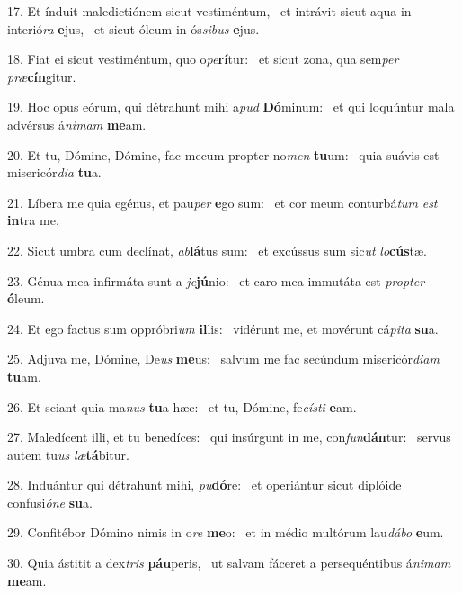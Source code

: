 17. Et índuit maledictiónem sicut vestiméntum, \dag\  et intrávit sicut aqua in interió\textit{ra} \textbf{e}jus, \ast\  et sicut óleum in ós\textit{si}\textit{bus} \textbf{e}jus.\

18. Fiat ei sicut vestiméntum, quo o\textit{pe}\textbf{rí}tur: \ast\  et sicut zona, qua sem\textit{per} \textit{præ}\textbf{cín}gitur.\

19. Hoc opus eórum, qui détrahunt mihi a\textit{pud} \textbf{Dó}minum: \ast\  et qui loquúntur mala advérsus á\textit{ni}\textit{mam} \textbf{me}am.\

20. Et tu, Dómine, Dómine, fac mecum propter no\textit{men} \textbf{tu}um: \ast\  quia suávis est misericór\textit{di}\textit{a} \textbf{tu}a.\

21. Líbera me quia egénus, et pau\textit{per} \textbf{e}go sum: \ast\  et cor meum conturbá\textit{tum} \textit{est} \textbf{in}tra me.\

22. Sicut umbra cum declínat, \textit{ab}\textbf{lá}tus sum: \ast\  et excússus sum sic\textit{ut} \textit{lo}\textbf{cús}tæ.\

23. Génua mea infirmáta sunt a \textit{je}\textbf{jú}nio: \ast\  et caro mea immutáta est \textit{prop}\textit{ter} \textbf{ó}leum.\

24. Et ego factus sum oppróbri\textit{um} \textbf{il}lis: \ast\  vidérunt me, et movérunt cá\textit{pi}\textit{ta} \textbf{su}a.\

25. Adjuva me, Dómine, De\textit{us} \textbf{me}us: \ast\  salvum me fac secúndum misericór\textit{di}\textit{am} \textbf{tu}am.\

26. Et sciant quia ma\textit{nus} \textbf{tu}a hæc: \ast\  et tu, Dómine, fe\textit{cís}\textit{ti} \textbf{e}am.\

27. Maledícent illi, et tu benedíces: \dag\  qui insúrgunt in me, con\textit{fun}\textbf{dán}tur: \ast\  servus autem tu\textit{us} \textit{læ}\textbf{tá}bitur.\

28. Induántur qui détrahunt mihi, \textit{pu}\textbf{dó}re: \ast\  et operiántur sicut diplóide confusi\textit{ó}\textit{ne} \textbf{su}a.\

29. Confitébor Dómino nimis in o\textit{re} \textbf{me}o: \ast\  et in médio multórum lau\textit{dá}\textit{bo} \textbf{e}um.\

30. Quia ástitit a dex\textit{tris} \textbf{páu}peris, \ast\  ut salvam fáceret a persequéntibus á\textit{ni}\textit{mam} \textbf{me}am.\

